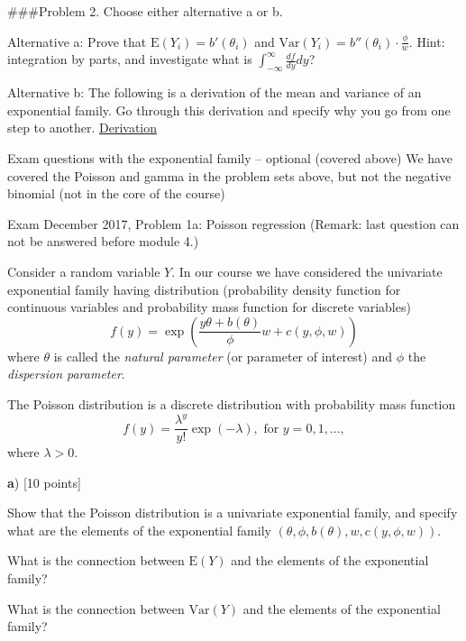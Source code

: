 \documentclass[
  ignorenonframetext,
]{beamer}
\begin{document}
\begin{frame}
\#\#\#Problem 2. Choose either alternative a or b.

Alternative a: Prove that \(\text{E}(Y_i)=b'(\theta_i)\) and
\(\text{Var}(Y_i)=b''(\theta_i)\cdot \frac{\phi}{w}\). Hint: integration
by parts, and investigate what is
\(\int_{-\infty}^{\infty} \frac{df}{dy}dy\)?

Alternative b: The following is a derivation of the mean and variance of
an exponential family. Go through this derivation and specify why you go
from one step to another.
\href{https://www.math.ntnu.no/emner/TMA4315/2017h/M5ExpFamProofEVar.pdf}{Derivation}
\end{frame}

\begin{frame}[fragile]
\begin{block}{Exam questions with the exponential family -- optional
(covered above)}
\protect\hypertarget{exam-questions-with-the-exponential-family-optional-covered-above}{}
We have covered the Poisson and gamma in the problem sets above, but not
the negative binomial (not in the core of the course)

\begin{block}{Exam December 2017, Problem 1a: Poisson regression}
\protect\hypertarget{exam-december-2017-problem-1a-poisson-regression}{}
(Remark: last question can not be answered before module 4.)

Consider a random variable \(Y\). In our course we have considered the
univariate exponential family having distribution (probability density
function for continuous variables and probability mass function for
discrete variables)
\[ f(y)=\exp(\frac{y \theta +b(\theta)}{\phi}w + c(y,\phi,w))\] where
\(\theta\) is called the \emph{natural parameter} (or parameter of
interest) and \(\phi\) the \emph{dispersion parameter}.

The Poisson distribution is a discrete distribution with probability
mass function
\[ f(y)=\frac{\lambda^{y}}{y!}\exp(- \lambda), \text{ for } y=0,1,...,\]
where \(\lambda>0\).

\textbf{a}) {[}10 points{]}

Show that the Poisson distribution is a univariate exponential family,
and specify what are the elements of the exponential family
\((\theta,\phi,b(\theta),w,c(y,\phi,w))\).

What is the connection between \(\text{E}(Y)\) and the elements of the
exponential family?

What is the connection between \(\text{Var}(Y)\) and the elements of the
exponential family?


\end{block}
\end{block}
\end{frame}
\end{document}
